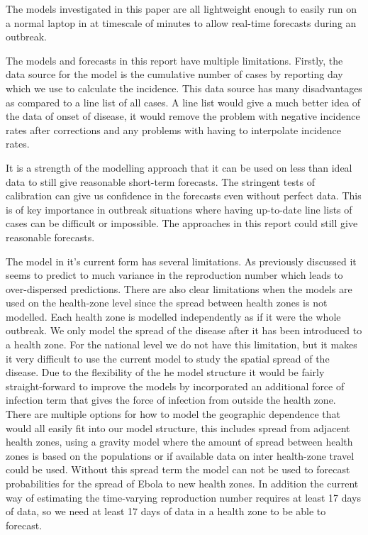 \documentclass[12pt]{article}
\begin{document}
The models investigated in this paper are all lightweight enough to easily run on a normal laptop in at timescale of minutes to allow real-time forecasts during an outbreak. 



The models and forecasts in this report have multiple limitations. Firstly, the data source for the model is the cumulative number of cases by reporting day which we use to calculate the incidence. This data source has many disadvantages as compared to a line list of all cases. A line list would give a much better idea of the data of onset of disease, it would remove the problem with negative incidence rates after corrections and any problems with having to interpolate incidence rates.

It is a strength of the modelling approach that it can be used on less than ideal data to still give reasonable short-term forecasts. The stringent tests of calibration can give us confidence in the forecasts even without perfect data. This is of key importance in outbreak situations where having up-to-date line lists of cases can be difficult or impossible. The approaches in this report could still give reasonable forecasts. 

The model in it's current form has several limitations. As previously discussed it seems to predict to much variance in the reproduction number which leads to over-dispersed predictions. There are also clear limitations when the models are used on the health-zone level since the spread between health zones is not modelled. Each health zone is modelled independently as if it were the whole outbreak. We only model the spread of the disease after it has been introduced to a health zone. For the national level we do not have this limitation, but it makes it very difficult to use the current model to study the spatial spread of the disease. Due to the flexibility of the he model structure it would be fairly straight-forward to improve the models by incorporated an additional force of infection term that gives the force of infection from outside the health zone. There are multiple options for how to model the geographic dependence that would all easily fit into our model structure, this includes spread from adjacent health zones, using a gravity model where the amount of spread between health zones is based on the populations \cite{haynesGravitySpatialInteraction1985} or if available data on inter health-zone travel could be used. Without this spread term the model can not be used to forecast probabilities for the spread of Ebola to new health zones. In addition the current way of estimating the time-varying reproduction number requires at least 17 days of data, so we need at least 17 days of data in a health zone to be able to forecast.
\end{document}
